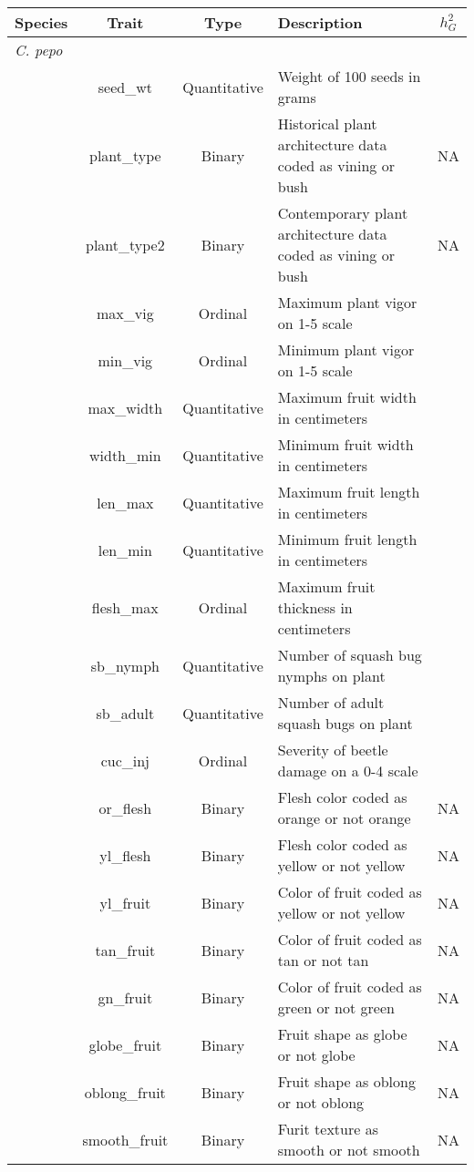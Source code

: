 \documentclass[utf8]{FrontiersinHarvard} %
\begin{document}
\begin{longtable}{p{1cm} c c p{4cm} c}
\hline
\textbf{Species} & \textbf{Trait} & \textbf{Type} & \textbf{Description} & \textbf{$h_{G}^{2}$} \\
\hline
\emph{C. pepo} & & & & \\
\hline
& seed\_wt & Quantitative & Weight of 100 seeds in grams& \\
& plant\_type & Binary & Historical plant architecture data coded as vining or bush& NA \\
& plant\_type2 & Binary & Contemporary plant architecture data coded as vining or bush& NA\\
& max\_vig & Ordinal & Maximum plant vigor on 1-5 scale& \\
& min\_vig & Ordinal & Minimum plant vigor on 1-5 scale & \\
& max\_width & Quantitative & Maximum fruit width in centimeters & \\
& width\_min & Quantitative & Minimum fruit width in centimeters & \\
& len\_max & Quantitative & Maximum fruit length in centimeters & \\
& len\_min & Quantitative & Minimum fruit length in centimeters & \\
& flesh\_max & Ordinal & Maximum fruit thickness in centimeters & \\
& sb\_nymph & Quantitative & Number of squash bug nymphs on plant & \\
& sb\_adult & Quantitative & Number of adult squash bugs on plant & \\
& cuc\_inj & Ordinal & Severity of beetle damage on a 0-4 scale & \\
& or\_flesh & Binary & Flesh color coded as orange or not orange & NA \\
& yl\_flesh & Binary & Flesh color coded as yellow or not yellow & NA \\
& yl\_fruit & Binary & Color of fruit coded as yellow or not yellow & NA\\
& tan\_fruit & Binary & Color of fruit coded as tan or not tan & NA \\
& gn\_fruit & Binary & Color of fruit coded as green or not green & NA \\
& globe\_fruit & Binary & Fruit shape as globe or not globe & NA\\
& oblong\_fruit & Binary & Fruit shape as oblong or not oblong & NA\\
& smooth\_fruit & Binary & Furit texture as smooth or not smooth & NA\\

\end{longtable}
\end{document}
